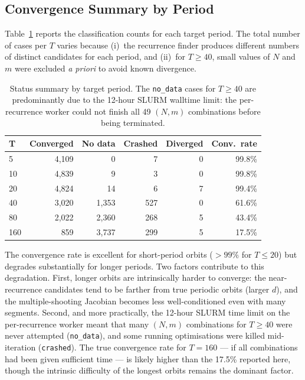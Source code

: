 \documentclass[11pt,a4paper]{article}
\begin{document}
\subsection{Convergence Summary by Period}
Table~\ref{tab:status_summary} reports the classification counts for each
target period.  The total number of cases per $T$ varies because (i)~the
recurrence finder produces different numbers of distinct candidates for each
period, and (ii)~for $T \ge 40$, small values of $N$ and $m$ were excluded
\textit{a priori} to avoid known divergence.

\begin{table}[htbp]
  \centering
  \caption{Status summary by target period.  The \texttt{no\_data} cases for
           $T \ge 40$ are predominantly due to the 12-hour SLURM walltime
           limit: the per-recurrence worker could not finish all 49 $(N,m)$
           combinations before being terminated.}
  \label{tab:status_summary}
  \begin{tabular}{@{}lrrrrr@{}}
    \toprule
    \textbf{T} & \textbf{Converged} & \textbf{No data} & \textbf{Crashed} &
    \textbf{Diverged} & \textbf{Conv.\ rate} \\
    \midrule
    5   & 4,109 & 0     & 7   & 0   & 99.8\% \\
    10  & 4,839 & 9     & 3   & 0   & 99.8\% \\
    20  & 4,824 & 14    & 6   & 7   & 99.4\% \\
    40  & 3,020 & 1,353 & 527 & 0   & 61.6\% \\
    80  & 2,022 & 2,360 & 268 & 5   & 43.4\% \\
    160 & 859   & 3,737 & 299 & 5   & 17.5\% \\
    \bottomrule
  \end{tabular}
\end{table}

The convergence rate is excellent for short-period orbits ($>\!99\%$ for
$T \le 20$) but degrades substantially for longer periods.  Two factors
contribute to this degradation.  First, longer orbits are intrinsically
harder to converge: the near-recurrence candidates tend to be farther from
true periodic orbits (larger $d$), and the multiple-shooting Jacobian
becomes less well-conditioned even with many segments.  Second, and more
practically, the 12-hour SLURM time limit on the per-recurrence worker meant
that many $(N,m)$ combinations for $T \ge 40$ were never attempted
(\texttt{no\_data}), and some running optimisations were killed mid-iteration
(\texttt{crashed}).  The true convergence rate for $T = 160$ --- if all
combinations had been given sufficient time --- is likely higher than the
17.5\% reported here, though the intrinsic difficulty of the longest orbits
remains the dominant factor.
\end{document}
